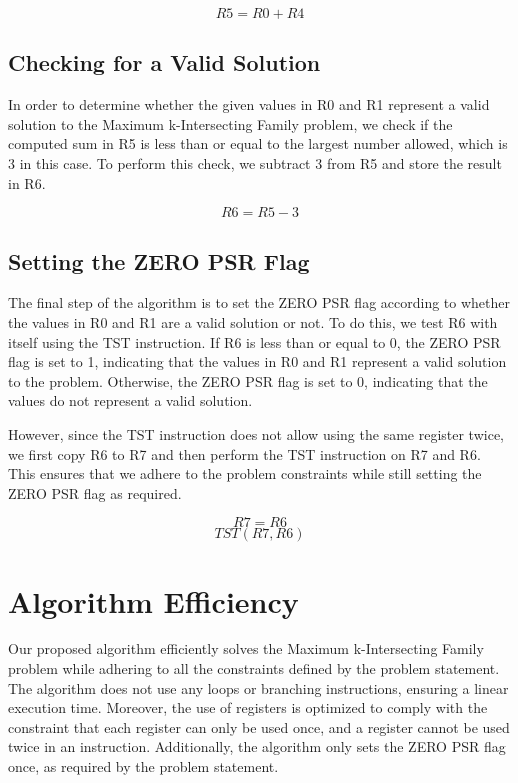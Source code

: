 \begin{equation}
    R5 = R0 + R4
\end{equation}

\subsection{Checking for a Valid Solution}
In order to determine whether the given values in R0 and R1 represent a valid solution to the Maximum k-Intersecting Family problem, we check if the computed sum in R5 is less than or equal to the largest number allowed, which is 3 in this case. To perform this check, we subtract 3 from R5 and store the result in R6.

\begin{equation}
    R6 = R5 - 3
\end{equation}

\subsection{Setting the ZERO PSR Flag}
The final step of the algorithm is to set the ZERO PSR flag according to whether the values in R0 and R1 are a valid solution or not. To do this, we test R6 with itself using the TST instruction. If R6 is less than or equal to 0, the ZERO PSR flag is set to 1, indicating that the values in R0 and R1 represent a valid solution to the problem. Otherwise, the ZERO PSR flag is set to 0, indicating that the values do not represent a valid solution.

However, since the TST instruction does not allow using the same register twice, we first copy R6 to R7 and then perform the TST instruction on R7 and R6. This ensures that we adhere to the problem constraints while still setting the ZERO PSR flag as required.

\begin{equation}
    R7 = R6
\end{equation}
\begin{equation}
    TST(R7, R6)
\end{equation}

\section{Algorithm Efficiency}
Our proposed algorithm efficiently solves the Maximum k-Intersecting Family problem while adhering to all the constraints defined by the problem statement. The algorithm does not use any loops or branching instructions, ensuring a linear execution time. Moreover, the use of registers is optimized to comply with the constraint that each register can only be used once, and a register cannot be used twice in an instruction. Additionally, the algorithm only sets the ZERO PSR flag once, as required by the problem statement.



